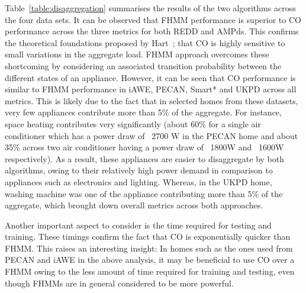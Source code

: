 \documentclass{sig-alternate}
\newcommand{\tabref}[1]{Table~\ref{#1}}
\begin{document}
\tabref{table:disaggregation} summarises the results of the two algorithms across the four data sets. It can be observed that FHMM performance is superior to CO performance across the three metrics for both REDD and AMPds. This confirms the theoretical foundations proposed by Hart~\cite{hart_1992}; that CO is highly sensitive to small variations in the aggregate load. FHMM approach overcomes these shortcoming by considering an associated transition probability between the different states of an appliance. However, it can be seen that CO performance is similar to FHMM performance in iAWE, PECAN, Smart* and UKPD across all metrics. This is likely due to the fact that in selected homes from these datasets, very few appliances contribute more than 5\% of the aggregate. For instance, space heating contributes very significantly (about 60\% for a single air conditioner which has a power draw of ~2700 W in the PECAN home and about 35\% across two air conditioner having a power draw of ~1800W and ~1600W respectively). As a result, these appliances are easier to disaggregate by both algorithms, owing to their relatively high power demand in comparison to appliances such as electronics and lighting. Whereas, in the UKPD home, washing machine was one of the appliance contributing more than 5\% of the aggregate, which brought down overall metrics across both approaches. 

Another important aspect to consider is the time required for testing and training. These timings confirm the fact that CO is exponentially quicker than FHMM. This raises an interesting insight: In homes such as the ones used from PECAN and iAWE in the above analysis, it may be beneficial to use CO over a FHMM owing to the less amount of time required for training and testing, even though FHMMs are in general considered to be more powerful.
\end{document}
